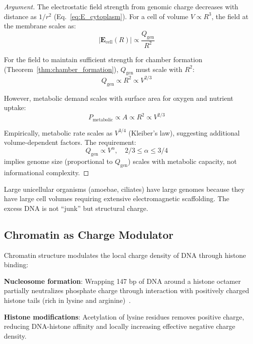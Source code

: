 \documentclass[twocolumn,10pt,aps,prd,superscriptaddress,floatfix,nofootinbib]{revtex4-2}
\theoremstyle{remark}
\newcommand{\Ecell}{\mathbf{E}_{\mathrm{cell}}}
\newcommand{\Qgen}{Q_{\mathrm{gen}}}
\begin{document}
\begin{proof}[Argument]
The electrostatic field strength from genomic charge decreases with distance as $1/r^2$ (Eq.~\eqref{eq:E_cytoplasm}). For a cell of volume $V \propto R^3$, the field at the membrane scales as:
\begin{equation}
|\Ecell(R)| \propto \frac{\Qgen}{R^2}
\end{equation}

For the field to maintain sufficient strength for chamber formation (Theorem~\ref{thm:chamber_formation}), $\Qgen$ must scale with $R^2$:
\begin{equation}
\Qgen \propto R^2 \propto V^{2/3}
\end{equation}

However, metabolic demand scales with surface area for oxygen and nutrient uptake:
\begin{equation}
P_{\mathrm{metabolic}} \propto A \propto R^2 \propto V^{2/3}
\end{equation}

Empirically, metabolic rate scales as $V^{3/4}$ (Kleiber's law), suggesting additional volume-dependent factors. The requirement:
\begin{equation}
\Qgen \propto V^{\alpha}, \quad 2/3 \leq \alpha \leq 3/4
\end{equation}
implies genome size (proportional to $\Qgen$) scales with metabolic capacity, not informational complexity.
\end{proof}

Large unicellular organisms (amoebae, ciliates) have large genomes because they have large cell volumes requiring extensive electromagnetic scaffolding. The excess DNA is not ``junk'' but structural charge.

\subsection{Chromatin as Charge Modulator}

Chromatin structure modulates the local charge density of DNA through histone binding:

\textbf{Nucleosome formation}: Wrapping 147 bp of DNA around a histone octamer partially neutralizes phosphate charge through interaction with positively charged histone tails (rich in lysine and arginine)~\cite{Luger1997}.

\textbf{Histone modifications}: Acetylation of lysine residues removes positive charge, reducing DNA-histone affinity and locally increasing effective negative charge density.
\end{document}
